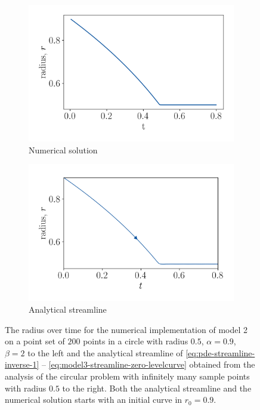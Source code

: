 \begin{figure}
    \centering
    \begin{subfigure}[h]{0.49\textwidth}
        \centering
        \includegraphics[width=\linewidth]{figures/Results/Circle/model3/circlepoints-a09-rad.png}
        \caption{Numerical solution}
        \label{fig:m3-circle-numerical-radius}
    \end{subfigure}%
    \begin{subfigure}[h]{0.49\textwidth}
        \centering
        \includegraphics[width=\linewidth]{figures/Circle-radii/mod3-r09.png}
        \caption{Analytical streamline}
        \label{fig:m3-circle-analytical-radius}
    \end{subfigure}
    \caption[Model 3 - Circle, Radius]{The radius over time for the numerical implementation of model 2 on a point set of $200$ points in a circle with radius $0.5$, $\alpha=0.9$, $\beta=2$ to the left and the analytical streamline of \eqref{eq:pde-streamline-inverse-1} -- \eqref{eq:model3-streamline-zero-levelcurve} obtained from the analysis of the circular problem with infinitely many sample points with radius $0.5$ to the right. Both the analytical streamline and the numerical solution starts with an initial curve in $r_0=0.9$.}
    \label{fig:m3-circle-radius-numanal}
\end{figure}

